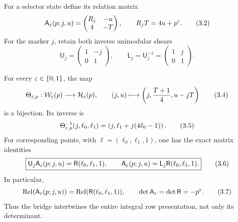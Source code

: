 For a selector state define its relation matrix
\begin{equation}
 \mathsf A_\varepsilon(p;j,u)=
 \begin{pmatrix}
 R_j&-u\\
 4&-T
 \end{pmatrix},
 \qquad R_jT=4u+p^\varepsilon.                                     \tag{3.2}
\end{equation}
For the marker \(j\), retain both inverse unimodular shears
\begin{equation}
 \mathsf U_j=
 \begin{pmatrix}1&-j\\0&1\end{pmatrix},
 \qquad
 \mathsf L_j=\mathsf U_j^{-1}=
 \begin{pmatrix}1&j\\0&1\end{pmatrix}.                    \tag{3.3}
\end{equation}

\begin{theorem}\label{thm:esksb-bridge}
For every \(\varepsilon\in\{0,1\}\), the map
\begin{equation}
 \Theta_{\varepsilon,p}:\mathcal W_\varepsilon(p)\longrightarrow\mathcal H_\varepsilon(p),
 \qquad
 (j,u)\longmapsto
 \left(j,\frac{T+1}{4},u-jT\right)                          \tag{3.4}
\end{equation}
is a bijection.  Its inverse is
\begin{equation}
 \Theta_{\varepsilon,p}^{-1}(j,\ell_0,\ell_1)
 =\left(j,\ell_1+j(4\ell_0-1)\right).                       \tag{3.5}
\end{equation}
For corresponding points, with
\(\ell=(\ell_0,\ell_1,1)\), one has the exact matrix identities
\begin{equation}
 \boxed{
 \mathsf U_j\mathsf A_\varepsilon(p;j,u)
 =\mathsf R(\ell_0,\ell_1,1),
 \qquad
 \mathsf A_\varepsilon(p;j,u)
 =\mathsf L_j\mathsf R(\ell_0,\ell_1,1).}                  \tag{3.6}
\end{equation}
In particular,
\begin{equation}
 \operatorname{Rel}(\mathsf A_\varepsilon(p;j,u))
 =\operatorname{Rel}(\mathsf R(\ell_0,\ell_1,1)),
 \qquad
 \det\mathsf A_\varepsilon=\det\mathsf R=-p^\varepsilon.                \tag{3.7}
\end{equation}
Thus the bridge intertwines the entire integral row presentation, not only
its determinant.
\end{theorem}

